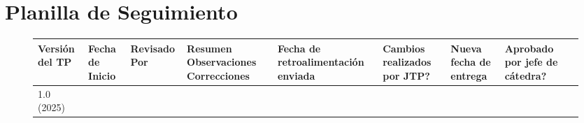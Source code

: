 \documentclass[chaptersright]{informeutn}
\begin{document}
      \section{Planilla de Seguimiento}
      \begin{figure}[!h]
        \begin{footnotesize}
          \begin{tabular}{|m{1cm}|m{1cm}|m{1.3cm}|m{2cm}|m{1.7cm}|m{1.7cm}|m{1.7cm}|m{1.7cm}|m{1.7cm}|}
            \hline
            Versión del TP & Fecha de Inicio & Revisado Por & Resumen Observaciones Correcciones &
            Fecha de retroalimentación enviada & Cambios realizados por JTP? & Nueva fecha de entrega &
            Aprobado por jefe de cátedra?\\
            \hline
            1.0 (2025) & & & & & & &\\
            \hline
          \end{tabular}
        \end{footnotesize}
      \end{figure}

  \printbibliography
\end{document}
